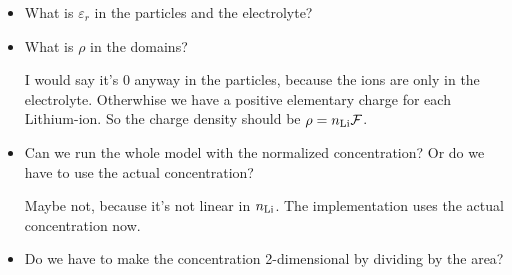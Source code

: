 \documentclass[a4paper,11pt]{scrartcl}
\newcommand*{\Li}{\ce{Li}}
\newcommand*{\n}{n_{\Li}}
\newcommand*{\F}{\mathcal{F}}
\begin{document}
\begin{itemize}
\item What is $\varepsilon_r$ in the particles and the electrolyte?

\item What is $\rho$ in the domains?

  I would say it's 0 anyway in the particles, because the ions are only in the electrolyte.
  Otherwhise we have a positive elementary charge for each Lithium-ion.
  So the charge density should be $\rho = \n \F$.

\item Can we run the whole model with the normalized concentration?
  Or do we have to use the actual concentration?

  Maybe not, because it's not linear in $\n$.
  The implementation uses the actual concentration now.

\item Do we have to make the concentration 2-dimensional by dividing by the area?

\end{itemize}

{}

\end{document}
